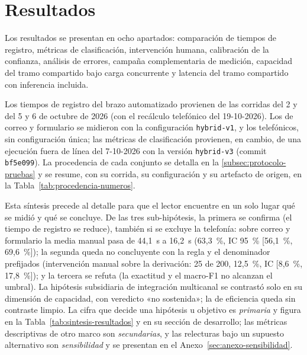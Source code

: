 \section{Resultados}\label{sec:resultados}

Los resultados se presentan en ocho apartados: comparación de tiempos de registro, métricas de clasificación, intervención humana, calibración de la confianza, análisis de errores, campaña complementaria de medición, capacidad del tramo compartido bajo carga concurrente y latencia del tramo compartido con inferencia incluida.

Los tiempos de registro del brazo automatizado provienen de las corridas del 2 y del 5 y 6 de octubre de 2026 (con el recálculo telefónico del 19-10-2026). Los de correo y formulario se midieron con la configuración \texttt{hybrid-v1}, y los telefónicos, sin configuración única; las métricas de clasificación provienen, en cambio, de una ejecución fuera de línea del 7-10-2026 con la versión \texttt{hybrid-v3} (commit \texttt{bf5e099}). La procedencia de cada conjunto se detalla en la \autoref{subsec:protocolo-pruebas} y se resume, con su corrida, su configuración y su artefacto de origen, en la Tabla~\ref{tab:procedencia-numeros}.

Esta síntesis precede al detalle para que el lector encuentre en un solo lugar qué se midió y qué se concluye. De las tres sub-hipótesis, la primera se confirma (el tiempo de registro se reduce), también si se excluye la telefonía: sobre correo y formulario la media manual pasa de 44,1~s a 16,2~s (63,3~\%, IC 95~\% [56,1~\%, 69,6~\%]); la segunda queda no concluyente con la regla y el denominador prefijados (intervención manual sobre la derivación: 25 de 200, 12,5~\%, IC [8,6~\%, 17,8~\%]); y la tercera se refuta (la exactitud y el macro-F1 no alcanzan el umbral). La hipótesis subsidiaria de integración multicanal se contrastó solo en su dimensión de capacidad, con veredicto «no sostenida»; la de eficiencia queda sin contraste limpio. La cifra que decide una hipótesis u objetivo es \emph{primaria} y figura en la Tabla~\ref{tab:sintesis-resultados} y en su sección de desarrollo; las métricas descriptivas de otro marco son \emph{secundarias}, y las relecturas bajo un supuesto alternativo son \emph{sensibilidad} y se presentan en el Anexo~\ref{sec:anexo-sensibilidad}.

